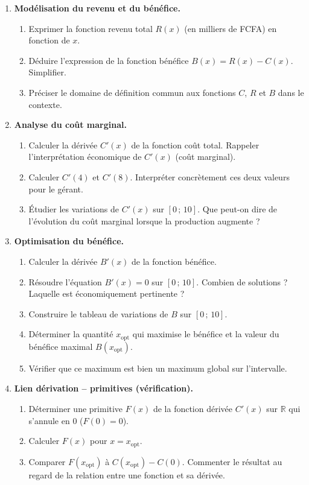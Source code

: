 \documentclass[11pt]{article}
\begin{document}
\begin{enumerate}
    \item \textbf{Modélisation du revenu et du bénéfice.}
    \begin{enumerate}
        \item Exprimer la fonction revenu total $R(x)$ (en milliers de FCFA) en fonction de $x$.
        \item Déduire l'expression de la fonction bénéfice $B(x) = R(x) - C(x)$. Simplifier.
        \item Préciser le domaine de définition commun aux fonctions $C$, $R$ et $B$ dans le contexte.
    \end{enumerate}

    \item \textbf{Analyse du coût marginal.}
    \begin{enumerate}
        \item Calculer la dérivée $C'(x)$ de la fonction coût total. Rappeler l'interprétation économique de $C'(x)$ (coût marginal).
        \item Calculer $C'(4)$ et $C'(8)$. Interpréter concrètement ces deux valeurs pour le gérant.
        \item Étudier les variations de $C'(x)$ sur $[0\,;\, 10]$. Que peut-on dire de l'évolution du coût marginal lorsque la production augmente ?
    \end{enumerate}

    \item \textbf{Optimisation du bénéfice.}
    \begin{enumerate}
        \item Calculer la dérivée $B'(x)$ de la fonction bénéfice.
        \item Résoudre l'équation $B'(x) = 0$ sur $[0\,;\, 10]$. Combien de solutions ? Laquelle est économiquement pertinente ?
        \item Construire le tableau de variations de $B$ sur $[0\,;\, 10]$.
        \item Déterminer la quantité $x_{\text{opt}}$ qui maximise le bénéfice et la valeur du bénéfice maximal $B(x_{\text{opt}})$.
        \item Vérifier que ce maximum est bien un maximum global sur l'intervalle.
    \end{enumerate}

    \item \textbf{Lien dérivation -- primitives (vérification).}
    \begin{enumerate}
        \item Déterminer une primitive $F(x)$ de la fonction dérivée $C'(x)$ sur $\mathbb{R}$ qui s'annule en $0$ ($F(0)=0$).
        \item Calculer $F(x)$ pour $x = x_{\text{opt}}$.
        \item Comparer $F(x_{\text{opt}})$ à $C(x_{\text{opt}}) - C(0)$. Commenter le résultat au regard de la relation entre une fonction et sa dérivée.
    \end{enumerate}


\end{enumerate}
\end{document}
